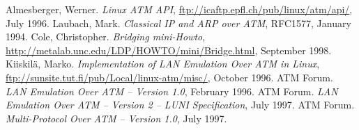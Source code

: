 \begin{thebibliography}{8}
  Almesberger, Werner.
    {\em Linux ATM API},
    \url{ftp://icaftp.epfl.ch/pub/linux/atm/api/},
    July 1996.
  Laubach, Mark.
    {\em Classical IP and ARP over ATM},
    RFC1577, January 1994.
   Cole, Christopher.
     {\em Bridging mini-Howto},
     \url{http://metalab.unc.edu/LDP/HOWTO/mini/Bridge.html},
     September 1998.
    Kiiskil\"a, Marko.
     {\em Implementation of LAN Emulation Over ATM in Linux},
     \url{ftp://sunsite.tut.fi/pub/Local/linux-atm/misc/},
     October 1996.
    ATM Forum.
     {\em LAN Emulation Over ATM -- Version 1.0},
     February 1996.
    ATM Forum.
     {\em LAN Emulation Over ATM -- Version 2 -- LUNI Specification},
     July 1997.
    ATM Forum.
     {\em Multi-Protocol Over ATM -- Version 1.0},
     July 1997.
\end{thebibliography}


